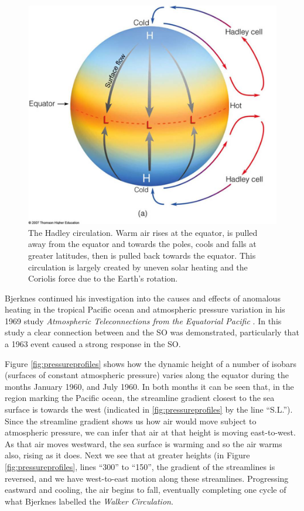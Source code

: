 \begin{figure}[t]
  \centering \includegraphics[width=0.9\linewidth]{figures/hadleycell.png}
  \caption{The Hadley circulation. Warm air rises at the equator, is pulled away
    from the equator and towards the poles, cools and falls at greater
    latitudes, then is pulled back towards the equator. This circulation is
    largely created by uneven solar heating and the Coriolis force due to the
    Earth's rotation.}
  \label{fig:hadleycell}
\end{figure}

Bjerknes continued his investigation into the causes and effects of anomalous
heating in the tropical Pacific ocean and atmospheric pressure variation in his
1969 study \emph{Atmospheric Teleconnections from the Equatorial Pacific}
\citet{bjerknes1969}. In this study a clear connection between \elnino{} and the
SO was demonstrated, particularly that a 1963 \elnino{} event caused a strong
response in the SO.

Figure \ref{fig:pressureprofiles} shows how the dynamic height of a number of
isobars (surfaces of constant atmospheric pressure) varies along the equator
during the months January 1960, and July 1960. In both months it can be seen
that, in the region marking the Pacific ocean, the streamline gradient closest
to the sea surface is towards the west (indicated in \ref{fig:pressureprofiles}
by the line ``S.L.''). Since the streamline gradient shows us how air would move
subject to atmospheric pressure, we can infer that air at that height is moving
east-to-west. As that air moves westward, the sea surface is warming and so the
air warms also, rising as it does. Next we see that at greater heights (in
Figure \ref{fig:pressureprofiles}, lines ``300'' to ``150'', the gradient of the
streamlines is reversed, and we have west-to-east motion along these
streamlines. Progressing eastward and cooling, the air begins to fall,
eventually completing one cycle of what Bjerknes labelled the \emph{Walker
  Circulation}.


